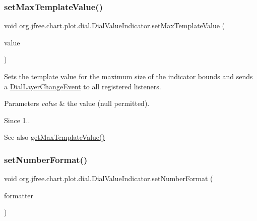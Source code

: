 \subsubsection{\texorpdfstring{set\+Max\+Template\+Value()}{setMaxTemplateValue()}}
{\footnotesize\ttfamily void org.\+jfree.\+chart.\+plot.\+dial.\+Dial\+Value\+Indicator.\+set\+Max\+Template\+Value (\begin{DoxyParamCaption}\item[{Number}]{value }\end{DoxyParamCaption})}

Sets the template value for the maximum size of the indicator bounds and sends a \mbox{\hyperlink{classorg_1_1jfree_1_1chart_1_1plot_1_1dial_1_1_dial_layer_change_event}{Dial\+Layer\+Change\+Event}} to all registered listeners.


\begin{DoxyParams}{Parameters}
{\em value} & the value ({\ttfamily null} permitted).\\
\hline
\end{DoxyParams}
\begin{DoxySince}{Since}
1..
\end{DoxySince}
\begin{DoxySeeAlso}{See also}
\mbox{\hyperlink{classorg_1_1jfree_1_1chart_1_1plot_1_1dial_1_1_dial_value_indicator_a101533e3bd8a775d29348f204da5e76d}{get\+Max\+Template\+Value()}} 
\end{DoxySeeAlso}
\mbox{\label{classorg_1_1jfree_1_1chart_1_1plot_1_1dial_1_1_dial_value_indicator_a7284f6333acb1edee3217d2fef2902ce}} 
\subsubsection{\texorpdfstring{set\+Number\+Format()}{setNumberFormat()}}
{\footnotesize\ttfamily void org.\+jfree.\+chart.\+plot.\+dial.\+Dial\+Value\+Indicator.\+set\+Number\+Format (\begin{DoxyParamCaption}\item[{Number\+Format}]{formatter }\end{DoxyParamCaption})}

